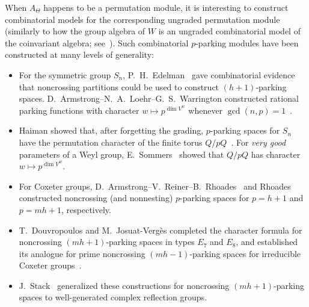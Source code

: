\documentclass[10pt,a4paper]{amsart}
\theoremstyle{definition}
\begin{document}
When $A_\Theta$ happens to be a permutation module, it is interesting to construct combinatorial models for the corresponding ungraded permutation module (similarly to how the group algebra of $W$ is an ungraded combinatorial model of the coinvariant algebra; see~).  Such combinatorial $p$-parking modules have been constructed at many levels of generality:

\begin{itemize}
\item For the symmetric group $S_n$, P.~H.~Edelman~\cite{Edelman} gave combinatorial evidence that noncrossing partitions could be used to construct $(h+1)$-parking spaces.  %
  D.~Armstrong--N.~A.~Loehr--G.~S.~Warrington constructed rational parking functions with character $w\mapsto p^{\dim V^w}$ whenever $\gcd(n,p)=1$~\cite[Theorem~3 and Corollary~4]{ALWRational}.  %
\item Haiman showed that, after forgetting the grading, $p$-parking spaces for $S_n$ have the permutation character of the finite torus $Q/pQ$~\cite{Haiman}.  For \emph{very good}
parameters of a Weyl group, E.~Sommers~\cite[Proposition 3.9]{Sommers} showed
that $Q/pQ$ has character $w\mapsto p^{\dim V^w}$.
\item For Coxeter groups, D.~Armstrong--V.~Reiner--B.~Rhoades~\cite{ARR} and
Rhoades~\cite{RhoadesFuss} constructed noncrossing (and nonnesting) $p$-parking spaces for $p=h+1$ and $p=mh+1$, respectively. 
\item T.~Douvropoulos and M.~Josuat-Verg\`es completed the character
formula for noncrossing $(mh+1)$-parking spaces in types $E_7$ and $E_8$,
and established its analogue for prime noncrossing $(mh-1)$-parking
spaces for irreducible Coxeter groups~\cite[Theorems~3.10 and~3.12]{DJVRefined}.
\item J.~Stack~\cite{StackParking} generalized these constructions for noncrossing $(mh+1)$-parking spaces to well-generated complex reflection groups.
\end{itemize}
\end{document}
